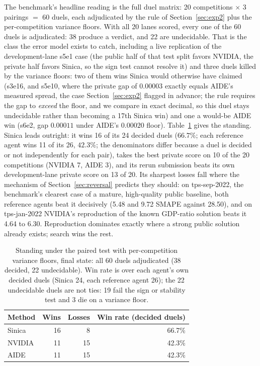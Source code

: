 \documentclass[11pt,a4paper]{article}
\begin{document}
The benchmark's headline reading is the full duel matrix: 20 competitions $\times$ 3 pairings $=$ 60 duels, each adjudicated by the rule of Section~\ref{sec:exp2} plus the per-competition variance floors. With all 20 lanes scored, every one of the 60 duels is adjudicated: 38 produce a verdict, and 22 are undecidable. That is the class the error model exists to catch, including a live replication of the development-lane s5e1 case (the public half of that test split favors NVIDIA, the private half favors Sinica, so the sign test cannot resolve it) and three duels killed by the variance floors: two of them wins Sinica would otherwise have claimed (s3e16, and s5e10, where the private gap of $0.00003$ exactly equals AIDE's measured spread, the case Section~\ref{sec:exp2} flagged in advance; the rule requires the gap to \emph{exceed} the floor, and we compare in exact decimal, so this duel stays undecidable rather than becoming a 17th Sinica win) and one a would-be AIDE win (s6e2, gap $0.00011$ under AIDE's $0.00020$ floor). Table~\ref{tab:winrates} gives the standing. Sinica leads outright: it wins 16 of its 24 decided duels ($66.7\%$; each reference agent wins 11 of its 26, $42.3\%$; the denominators differ because a duel is decided or not independently for each pair), takes the best private score on 10 of the 20 competitions (NVIDIA 7, AIDE 3), and its rerun submission beats its own development-lane private score on 13 of 20. Its sharpest losses fall where the mechanism of Section~\ref{sec:reversal} predicts they should: on tps-sep-2022, the benchmark's clearest case of a mature, high-quality public baseline, both reference agents beat it decisively (5.48 and 9.72 SMAPE against 28.50), and on tps-jan-2022 NVIDIA's reproduction of the known GDP-ratio solution beats it 4.64 to 6.30. Reproduction dominates exactly where a strong public solution already exists; search wins the rest.

\begin{table}[htbp]
\centering\small
\caption{Standing under the paired test with per-competition variance floors, final state:
all 60 duels adjudicated (38 decided, 22 undecidable).
Win rate is over each agent's own decided duels (Sinica 24, each reference agent 26);
the 22 undecidable duels are not ties: 19 fail the sign or stability test and 3 die on a
variance floor.}
\label{tab:winrates}
\begin{tabular}{@{}lrrr@{}}
\toprule
\textbf{Method} & \textbf{Wins} & \textbf{Losses} & \textbf{Win rate (decided duels)} \\
\midrule
Sinica & 16 & 8 & 66.7\% \\
NVIDIA   & 11 & 15 & 42.3\% \\
AIDE     & 11 & 15 & 42.3\% \\
\bottomrule
\end{tabular}
\end{table}
\end{document}

